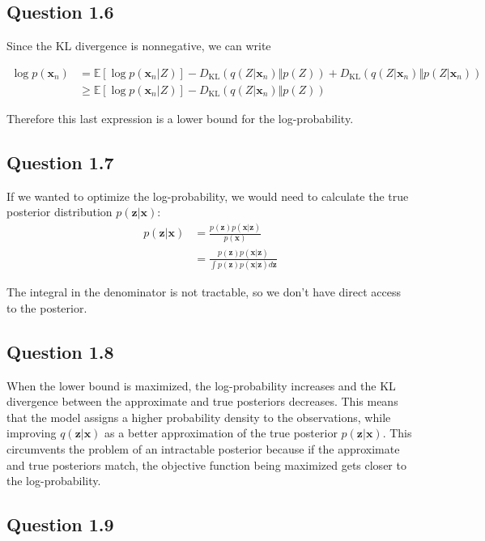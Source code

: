 \documentclass{article}
\begin{document}
\subsection*{Question 1.6}

Since the KL divergence is nonnegative, we can write

\begin{align*}
\log p(\mathbf{x}_n) &= \mathbb{E}[\log p(\mathbf{x}_n\vert Z)] - D_{\text{KL}}(q(Z\vert\mathbf{x}_n)\Vert p(Z)) + D_{\text{KL}}(q(Z\vert\mathbf{x}_n)\Vert p(Z\vert\mathbf{x}_n)) \\
&\geq \mathbb{E}[\log p(\mathbf{x}_n\vert Z)] - D_{\text{KL}}(q(Z\vert\mathbf{x}_n)\Vert p(Z))
\end{align*}

Therefore this last expression is a lower bound for the log-probability.

\subsection*{Question 1.7}

If we wanted to optimize the log-probability, we would need to calculate the true posterior distribution $p(\mathbf{z}\vert\mathbf{x})$:
\begin{align*}
p(\mathbf{z}\vert\mathbf{x}) &= \frac{p(\mathbf{z})p(\mathbf{x}\vert\mathbf{z})}{p(\mathbf{x})} \\
&= \frac{p(\mathbf{z})p(\mathbf{x}\vert\mathbf{z})}{\int p(\mathbf{z})p(\mathbf{x}\vert\mathbf{z})d\mathbf{z}}
\end{align*}

The integral in the denominator is not tractable, so we don't have direct access to the posterior.

\subsection*{Question 1.8}
When the lower bound is maximized, the log-probability increases and the KL divergence between the approximate and true posteriors decreases. This means that the model assigns a higher probability density to the observations, while improving $q(\mathbf{z}\vert\mathbf{x})$ as a better approximation of the true posterior $p(\mathbf{z}\vert\mathbf{x})$. This circumvents the problem of an intractable posterior because if the approximate and true posteriors match, the objective function being maximized gets closer to the log-probability.

\subsection*{Question 1.9}
\end{document}
